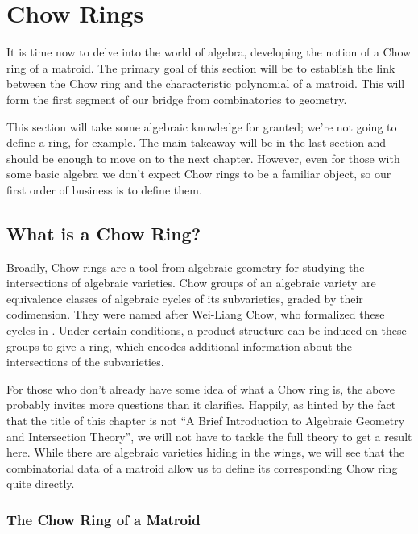 \documentclass[12pt,oneside]{../../sfsuthesis}
\begin{document}
\chapter{Chow Rings}

It is time now to delve into the world of algebra, developing the notion of a Chow ring of a matroid.
The primary goal of this section will be to establish the link between the Chow ring and the characteristic polynomial of a matroid.
This will form the first segment of our bridge from combinatorics to geometry.

This section will take some algebraic knowledge for granted; we're not going to define a ring, for example.
The main takeaway will be in the last section and should be enough to move on to the next chapter.
However, even for those with some basic algebra we don't expect Chow rings to be a familiar object, so our first order of business is to define them.

\section{What is a Chow Ring?}

Broadly, Chow rings are a tool from algebraic geometry for studying the intersections of algebraic varieties.
Chow groups of an algebraic variety are equivalence classes of algebraic cycles of its subvarieties, graded by their codimension.
They were named after Wei-Liang Chow, who formalized these cycles in \cite{chowEquivalenceClassesCycles1956}.
Under certain conditions, a product structure can be induced on these groups to give a ring, which encodes additional information about the intersections of the subvarieties.

For those who don't already have some idea of what a Chow ring is, the above probably invites more questions than it clarifies.
Happily, as hinted by the fact that the title of this chapter is not ``A Brief Introduction to Algebraic Geometry and Intersection Theory'', we will not have to tackle the full theory to get a result here.
While there are algebraic varieties hiding in the wings, we will see that the combinatorial data of a matroid allow us to define its corresponding Chow ring quite directly.

\subsection{The Chow Ring of a Matroid}
\end{document}
